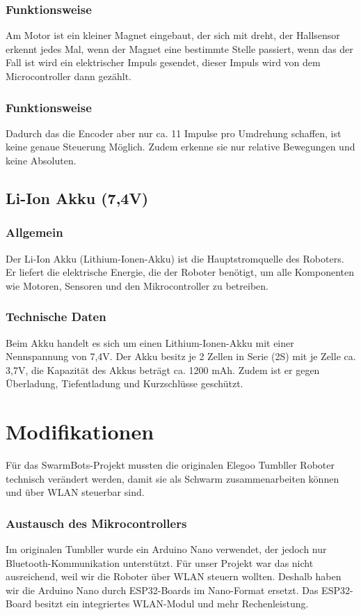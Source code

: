 \subsubsection{Funktionsweise}
Am Motor ist ein kleiner Magnet eingebaut, der sich mit dreht, der Hallsensor erkennt jedes Mal, wenn der Magnet eine bestimmte Stelle passiert, 
wenn das der Fall ist wird ein elektrischer Impuls gesendet, dieser Impuls wird von dem Microcontroller dann gezählt.
\subsubsection{Funktionsweise}
Dadurch das die Encoder aber nur ca. 11 Impulse pro Umdrehung schaffen, ist keine genaue Steuerung Möglich. 
Zudem erkenne sie nur relative Bewegungen und keine Absoluten.
%
\subsection{Li-Ion Akku (7,4V)}
%
\subsubsection{Allgemein}
Der Li-Ion Akku (Lithium-Ionen-Akku) ist die Hauptstromquelle des Roboters. 
Er liefert die elektrische Energie, die der Roboter benötigt, um alle Komponenten wie Motoren, Sensoren und den Mikrocontroller zu betreiben.
\subsubsection{Technische Daten}
Beim Akku handelt es sich um einen Lithium-Ionen-Akku mit einer Nennspannung von 7,4V. 
Der Akku besitz je 2 Zellen in Serie (2S) mit je Zelle ca. 3,7V, die Kapazität des Akkus beträgt ca. 1200 mAh. Zudem ist er gegen Überladung, Tiefentladung und Kurzschlüsse geschützt. 
%

\section{Modifikationen}
\label{subsec:hardware_modifikationen}
Für das SwarmBots-Projekt mussten die originalen Elegoo Tumbller Roboter technisch verändert werden, damit sie als Schwarm zusammenarbeiten können und über WLAN steuerbar sind.
\subsubsection{Austausch des Mikrocontrollers}
Im originalen Tumbller wurde ein Arduino Nano verwendet, der jedoch nur Bluetooth-Kommunikation unterstützt.
Für unser Projekt war das nicht ausreichend, weil wir die Roboter über WLAN steuern wollten.
Deshalb haben wir die Arduino Nano durch ESP32-Boards im Nano-Format ersetzt.
Das ESP32-Board besitzt ein integriertes WLAN-Modul und mehr Rechenleistung.
